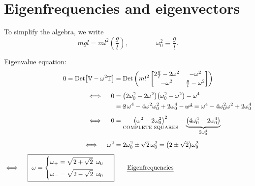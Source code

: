\documentclass[11pt]{article}
\newcommand{\Vm}{\mathbb{V}}
\newcommand{\Tm}{\mathbb{T}}
\newcommand{\rmath}[1]{\text{\retracted{\ensuremath{#1}}}}
\begin{document}
\section*{Eigenfrequencies and eigenvectors}

To simplify the algebra, we write
\begin{equation*}
  mgl = ml^2\left(\frac{g}{l}\right),
  \qquad\qquad
  \omega_0^2 \equiv \frac{g}{l} .
\end{equation*}

Eigenvalue equation:
\begin{align*}
  0 = \operatorname{Det}\bigl[\Vm - \omega^2\Tm\bigr]
    &= \operatorname{Det}\left( ml^2
       \begin{bmatrix}
         2\frac{g}{l} - 2\omega^2 & -\omega^2\\[2pt]
         -\omega^2 & \frac{g}{l} - \omega^2
       \end{bmatrix}\right)\\[4pt]
  \iff\quad
  0 &= \bigl(2\omega_0^2 - 2\omega^2\bigr)\bigl(\omega_0^2 - \omega^2\bigr) - \omega^4\\
    &= \rmath{2}\,\omega^4 - 4\omega^2\omega_0^2 + 2\omega_0^4 - \rmath{\omega^4}
     = \omega^4 - 4\omega_0^2\omega^2 + 2\omega_0^4\\[4pt]
  \iff\quad
  0 &= \underset{\text{\scriptsize COMPLETE SQUARES}}{\bigl(\omega^2 - 2\omega_0^2\bigr)^2}
      - \underbrace{\bigl(4\omega_0^4 - 2\omega_0^4\bigr)}_{2\omega_0^4}\\[4pt]
  \iff\quad
  \omega^2 &= 2\omega_0^2 \pm \sqrt{2}\,\omega_0^2 = \bigl(2\pm\sqrt2\bigr)\omega_0^2\\[4pt]
  \iff\quad
  \boxeq{\;\omega =
    \begin{cases}
      \omega_+ = \sqrt{2+\sqrt2}\ \,\omega_0\\[4pt]
      \omega_- = \sqrt{2-\sqrt2}\ \,\omega_0
    \end{cases}\;}
    &\qquad\text{\emph{Eigenfrequencies}}
\end{align*}
\end{document}

